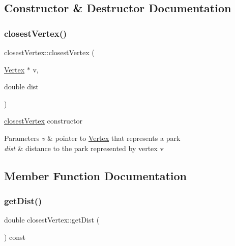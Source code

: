 \subsection{Constructor \& Destructor Documentation}
\hypertarget{classclosest_vertex_acd41491eb99e59a0f10ee8de0b50a66d}{}\label{classclosest_vertex_acd41491eb99e59a0f10ee8de0b50a66d} 
\subsubsection{\texorpdfstring{closest\+Vertex()}{closestVertex()}}
{\footnotesize\ttfamily closest\+Vertex\+::closest\+Vertex (\begin{DoxyParamCaption}\item[{\hyperlink{class_vertex}{Vertex} $\ast$}]{v,  }\item[{double}]{dist }\end{DoxyParamCaption})}



\hyperlink{classclosest_vertex}{closest\+Vertex} constructor 


\begin{DoxyParams}{Parameters}
{\em v} & pointer to \hyperlink{class_vertex}{Vertex} that represents a park\\
\hline
{\em dist} & distance to the park represented by vertex v \\
\hline
\end{DoxyParams}


\subsection{Member Function Documentation}
\hypertarget{classclosest_vertex_a2b8387796aa6b9dedaac682ee11ecc30}{}\label{classclosest_vertex_a2b8387796aa6b9dedaac682ee11ecc30} 
\subsubsection{\texorpdfstring{get\+Dist()}{getDist()}}
{\footnotesize\ttfamily double closest\+Vertex\+::get\+Dist (\begin{DoxyParamCaption}{ }\end{DoxyParamCaption}) const}



